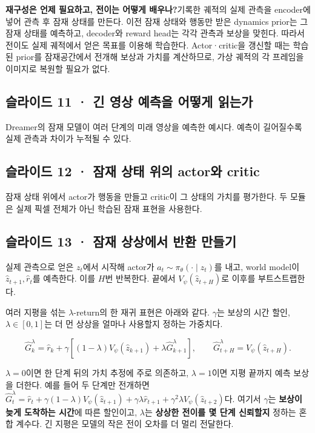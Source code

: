 \documentclass[11pt,a4paper]{article}
\begin{document}
\par\medskip\noindent\textbf{재구성은 언제 필요하고, 전이는 어떻게 배우나?}\quad 기록한 궤적의 실제 관측을 encoder에 넣어 관측 후 잠재 상태를 만든다. 이전 잠재 상태와 행동만 받은 dynamics prior는 그 잠재 상태를 예측하고, decoder와 reward head는 각각 관측과 보상을 맞힌다. 따라서 전이도 실제 궤적에서 얻은 목표를 이용해 학습한다. Actor·critic을 갱신할 때는 학습된 prior를 잠재공간에서 전개해 보상과 가치를 계산하므로, 가상 궤적의 각 프레임을 이미지로 복원할 필요가 없다.\par

\subsection{슬라이드 11 · 긴 영상 예측을 어떻게 읽는가}

Dreamer의 잠재 모델이 여러 단계의 미래 영상을 예측한 예시다. 예측이 길어질수록 실제 관측과 차이가 누적될 수 있다.\par

\subsection{슬라이드 12 · 잠재 상태 위의 actor와 critic}

잠재 상태 위에서 actor가 행동을 만들고 critic이 그 상태의 가치를 평가한다. 두 모듈은 실제 픽셀 전체가 아닌 학습된 잠재 표현을 사용한다.\par

\subsection{슬라이드 13 · 잠재 상상에서 반환 만들기}

실제 관측으로 얻은 $z_t$에서 시작해 actor가 $\hat a_t\sim\pi_\theta(\cdot\mid z_t)$를 내고, world model이 $\hat z_{t+1},\hat r_t$를 예측한다. 이를 $H$번 반복한다. 끝에서 $V_\psi(\hat z_{t+H})$로 이후를 부트스트랩한다.\par

여러 지평을 섞는 $\lambda$-return의 한 재귀 표현은 아래와 같다. $\gamma$는 보상의 시간 할인, $\lambda\in[0,1]$는 더 먼 상상을 얼마나 사용할지 정하는 가중치다.\par

\[
\widehat G_k^\lambda
=\hat r_k+\gamma\left[(1-\lambda)V_\psi(\hat z_{k+1})
+\lambda\widehat G_{k+1}^\lambda\right],
\qquad
\widehat G_{t+H}^\lambda=V_\psi(\hat z_{t+H}).
\]

$\lambda=0$이면 한 단계 뒤의 가치 추정에 주로 의존하고, $\lambda=1$이면 지평 끝까지 예측 보상을 더한다. 예를 들어 두 단계만 전개하면 $\widehat G_t^\lambda=\hat r_t+\gamma(1-\lambda)V_\psi(\hat z_{t+1})+\gamma\lambda\hat r_{t+1}+\gamma^2\lambda V_\psi(\hat z_{t+2})$다. 여기서 $\gamma$는 \textbf{보상이 늦게 도착하는 시간}에 따른 할인이고, $\lambda$는 \textbf{상상한 전이를 몇 단계 신뢰할지} 정하는 혼합 계수다. 긴 지평은 모델의 작은 전이 오차를 더 멀리 전달한다.\par
\end{document}
